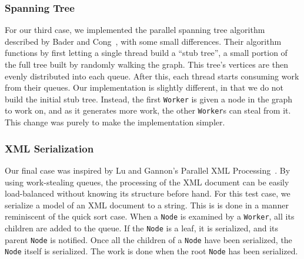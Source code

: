 \subsubsection{Spanning Tree} %
For our third case, we implemented the parallel spanning tree algorithm described by Bader and Cong~\cite{Bader04afast}, with some small differences. Their algorithm functions by first letting a single thread build a ``stub tree'', a small portion of the full tree built by randomly walking the graph. This tree's vertices are then evenly distributed into each queue. After this, each thread starts consuming work from their queues. Our implementation is slightly different, in that we do not build the initial stub tree. Instead, the first \texttt{Worker} is given a node in the graph to work on, and as it generates more work, the other \texttt{Worker}s can steal from it. This change was purely to make the implementation simpler.

\subsubsection{XML Serialization} %
Our final case was inspired by Lu and Gannon's Parallel XML Processing~\cite{Lu:2007:PXP:1272457.1272462}. By using work-stealing queues, the processing of the XML document can be easily load-balanced without knowing its structure before hand. For this test case, we serialize a model of an XML document to a string. This is is done in a manner reminiscent of the quick sort case. When a \texttt{Node} is examined by a \texttt{Worker}, all its children are added to the queue. If the \texttt{Node} is a leaf, it is serialized, and its parent \texttt{Node} is notified. Once all the children of a \texttt{Node} have been serialized, the \texttt{Node} itself is serialized. The work is done when the root \texttt{Node} has been serialized.
